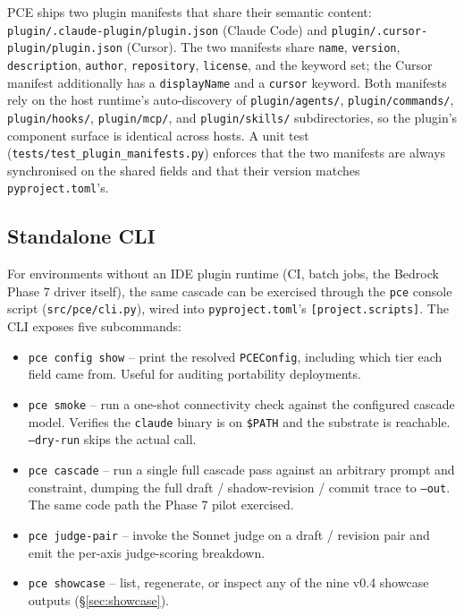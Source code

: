 PCE ships two plugin manifests that share their semantic content: \texttt{plugin/.claude-plugin/plugin.json} (Claude Code) and \texttt{plugin/.cursor-plugin/plugin.json} (Cursor). The two manifests share \texttt{name}, \texttt{version}, \texttt{description}, \texttt{author}, \texttt{repository}, \texttt{license}, and the keyword set; the Cursor manifest additionally has a \texttt{displayName} and a \texttt{cursor} keyword. Both manifests rely on the host runtime's auto-discovery of \texttt{plugin/agents/}, \texttt{plugin/commands/}, \texttt{plugin/hooks/}, \texttt{plugin/mcp/}, and \texttt{plugin/skills/} subdirectories, so the plugin's component surface is identical across hosts. A unit test (\texttt{tests/test\_plugin\_manifests.py}) enforces that the two manifests are always synchronised on the shared fields and that their version matches \texttt{pyproject.toml}'s.

\subsection{Standalone CLI}

For environments without an IDE plugin runtime (CI, batch jobs, the Bedrock Phase 7 driver itself), the same cascade can be exercised through the \texttt{pce} console script (\texttt{src/pce/cli.py}), wired into \texttt{pyproject.toml}'s \texttt{[project.scripts]}. The CLI exposes five subcommands:

\begin{itemize}[leftmargin=1.4em]
\item \texttt{pce config show} -- print the resolved \texttt{PCEConfig}, including which tier each field came from. Useful for auditing portability deployments.
\item \texttt{pce smoke} -- run a one-shot connectivity check against the configured cascade model. Verifies the \texttt{claude} binary is on \texttt{\$PATH} and the substrate is reachable. \texttt{--dry-run} skips the actual call.
\item \texttt{pce cascade} -- run a single full cascade pass against an arbitrary prompt and constraint, dumping the full draft / shadow-revision / commit trace to \texttt{--out}. The same code path the Phase 7 pilot exercised.
\item \texttt{pce judge-pair} -- invoke the Sonnet judge on a draft / revision pair and emit the per-axis judge-scoring breakdown.
\item \texttt{pce showcase} -- list, regenerate, or inspect any of the nine v0.4 showcase outputs (\S\ref{sec:showcase}).
\end{itemize}

